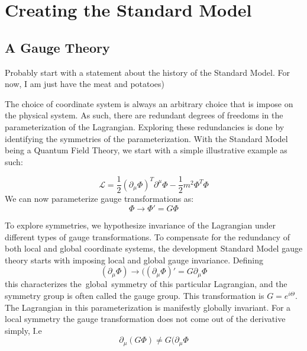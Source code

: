 \newcommand{\Lagr}{\mathcal{L}}




\chapter{Creating the Standard Model}



\section{A Gauge Theory}
\tab Probably start with a statement about the history of the Standard Model. For now, I am just have the meat and potatoes)

The choice of coordinate system is always an arbitrary choice that is impose on the physical system. As such, there are redundant degrees of freedoms in the parameterization of the Lagrangian. Exploring these redundancies is done by identifying the symmetries of the parameterization. With the Standard Model being a Quantum Field Theory, we start with a simple illustrative example as such:

\begin{equation*}
    \Lagr = \frac{1}{2}(\partial_{\mu} \Phi)^T \partial^{\mu}\Phi - \frac{1}{2}m^2\Phi^T\Phi
\end{equation*}
We can now parameterize gauge transformations as:
\begin{equation*}
    \Phi \rightarrow \Phi ' = G\Phi
\end{equation*}

To explore  symmetries, we hypothesize invariance of the Lagrangian under different types of gauge transformations. To compensate for the redundancy of both local and global coordinate systems, the development Standard Model gauge theory starts with imposing local and global gauge invariance. Defining 
\begin{equation*}
    (\partial_{\mu}\Phi) \rightarrow ((\partial_{\mu}\Phi)' = G\partial_{\mu}\Phi
\end{equation*}
this characterizes the global symmetry of this particular Lagrangian, and the symmetry group is often called the gauge group. This transformation is $G = e^{i\Theta}$. The Lagrangian in this parameterization is manifestly globally invariant. 
For a local symmetry the gauge transformation does not come out of the derivative simply, I.e  
\begin{equation*}
    \partial_{\mu}(G\Phi) \neq G(\partial_{\mu}\Phi
\end{equation*}

